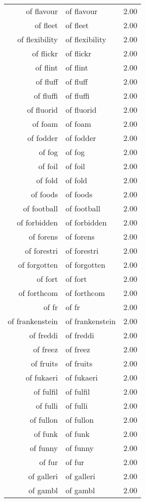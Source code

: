 \begin{table}[ht]
\begin{tabular}{rlr}
  of flavour & of flavour & 2.00 \\ 
  of fleet & of fleet & 2.00 \\ 
  of flexibility & of flexibility & 2.00 \\ 
  of flickr & of flickr & 2.00 \\ 
  of flint & of flint & 2.00 \\ 
  of fluff & of fluff & 2.00 \\ 
  of fluffi & of fluffi & 2.00 \\ 
  of fluorid & of fluorid & 2.00 \\ 
  of foam & of foam & 2.00 \\ 
  of fodder & of fodder & 2.00 \\ 
  of fog & of fog & 2.00 \\ 
  of foil & of foil & 2.00 \\ 
  of fold & of fold & 2.00 \\ 
  of foods & of foods & 2.00 \\ 
  of football & of football & 2.00 \\ 
  of forbidden & of forbidden & 2.00 \\ 
  of forens & of forens & 2.00 \\ 
  of forestri & of forestri & 2.00 \\ 
  of forgotten & of forgotten & 2.00 \\ 
  of fort & of fort & 2.00 \\ 
  of forthcom & of forthcom & 2.00 \\ 
  of fr & of fr & 2.00 \\ 
  of frankenstein & of frankenstein & 2.00 \\ 
  of freddi & of freddi & 2.00 \\ 
  of freez & of freez & 2.00 \\ 
  of fruits & of fruits & 2.00 \\ 
  of fukaeri & of fukaeri & 2.00 \\ 
  of fulfil & of fulfil & 2.00 \\ 
  of fulli & of fulli & 2.00 \\ 
  of fullon & of fullon & 2.00 \\ 
  of funk & of funk & 2.00 \\ 
  of funny & of funny & 2.00 \\ 
  of fur & of fur & 2.00 \\ 
  of galleri & of galleri & 2.00 \\ 
  of gambl & of gambl & 2.00 \\ 

\end{tabular}
\end{table}
